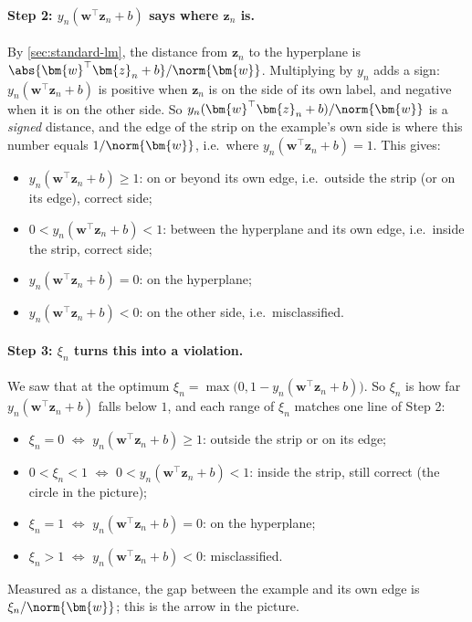 \paragraph{Step 2: \(y_n (\bm{w}^\top \bm{z}_n + b)\) says where
\(\bm{z}_n\) is.} By \autoref{sec:standard-lm}, the distance from
\(\bm{z}_n\) to the hyperplane is \(\abs{\bm{w}^\top \bm{z}_n + b} /
\norm{\bm{w}}\). Multiplying by \(y_n\) adds a sign: \(y_n (\bm{w}^\top
\bm{z}_n + b)\) is positive when \(\bm{z}_n\) is on the side of its own
label, and negative when it is on the other side. So \(y_n (\bm{w}^\top
\bm{z}_n + b) / \norm{\bm{w}}\) is a \emph{signed} distance, and the edge of
the strip on the example's own side is where this number equals \(1 /
\norm{\bm{w}}\), i.e.\ where \(y_n (\bm{w}^\top \bm{z}_n + b) = 1\). This
gives:
\begin{itemize}
    \item \(y_n (\bm{w}^\top \bm{z}_n + b) \ge 1\): on or beyond its own
        edge, i.e.\ outside the strip (or on its edge), correct side;
    \item \(0 < y_n (\bm{w}^\top \bm{z}_n + b) < 1\): between the hyperplane
        and its own edge, i.e.\ inside the strip, correct side;
    \item \(y_n (\bm{w}^\top \bm{z}_n + b) = 0\): on the hyperplane;
    \item \(y_n (\bm{w}^\top \bm{z}_n + b) < 0\): on the other side, i.e.\
        misclassified.
\end{itemize}

\paragraph{Step 3: \(\xi_n\) turns this into a violation.} We saw that at
the optimum \(\xi_n = \max\bigl(0, 1 - y_n (\bm{w}^\top \bm{z}_n +
b)\bigr)\). So \(\xi_n\) is how far \(y_n (\bm{w}^\top \bm{z}_n + b)\) falls
below \(1\), and each range of \(\xi_n\) matches one line of Step 2:
\begin{itemize}
    \item \(\xi_n = 0\) \(\iff\) \(y_n (\bm{w}^\top \bm{z}_n + b) \ge 1\):
        outside the strip or on its edge;
    \item \(0 < \xi_n < 1\) \(\iff\) \(0 < y_n (\bm{w}^\top \bm{z}_n + b) <
        1\): inside the strip, still correct (the circle in the picture);
    \item \(\xi_n = 1\) \(\iff\) \(y_n (\bm{w}^\top \bm{z}_n + b) = 0\): on
        the hyperplane;
    \item \(\xi_n > 1\) \(\iff\) \(y_n (\bm{w}^\top \bm{z}_n + b) < 0\):
        misclassified.
\end{itemize}
Measured as a distance, the gap between the example and its own edge is
\(\xi_n / \norm{\bm{w}}\); this is the arrow in the picture.

